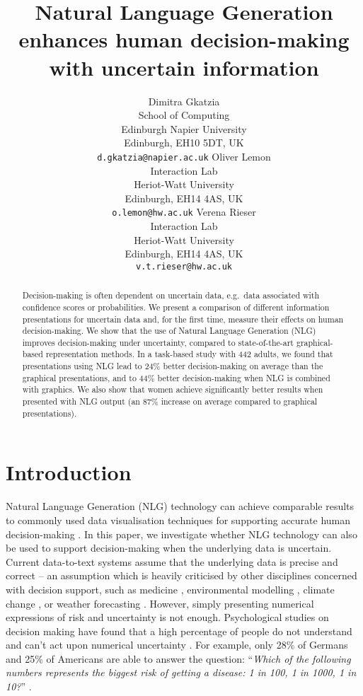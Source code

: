 \documentclass[11pt]{article}
\title{Natural Language Generation enhances human decision-making with uncertain information}%
\author{Dimitra Gkatzia\\
	    School of Computing\\
	    Edinburgh Napier University\\
	    Edinburgh, EH10 5DT, UK\\
	    {\tt d.gkatzia@napier.ac.uk}
	  \And
	Oliver Lemon\\
  	Interaction Lab\\
  	Heriot-Watt University\\
  	Edinburgh, EH14 4AS, UK\\
  {\tt o.lemon@hw.ac.uk}
    \And
	Verena Rieser\\
  	Interaction Lab\\
  	Heriot-Watt University\\
  	Edinburgh, EH14 4AS, UK\\
  {\tt v.t.rieser@hw.ac.uk}}
\date{}
\begin{document}
\maketitle

\begin{abstract}
Decision-making is often dependent on uncertain data, e.g.\ data associated with confidence scores or  probabilities.
We present a  comparison of different information presentations for uncertain data and, for the first time, measure their effects on human decision-making. 
We show that 
 the use of Natural Language Generation (NLG) improves decision-making under uncertainty,  
 compared to  state-of-the-art graphical-based representation methods. In a task-based study with 442 adults, we found that  presentations using NLG lead to 24\% better decision-making on average than the graphical presentations, and to 44\% better decision-making when NLG is combined with graphics.
We also show that 
women achieve significantly better results when   presented with NLG output (an  87\% increase on average compared to graphical presentations). 
\end{abstract}

\section{Introduction}

Natural Language Generation (NLG)  technology can achieve comparable results to commonly used data visualisation techniques for supporting accurate human decision-making \cite{Gatt2009}.
In this paper, we investigate whether NLG technology can also be used to support decision-making when the underlying data is uncertain. 
%
%
Current  data-to-text systems assume that the underlying data is precise and correct -- an assumption which is heavily criticised by other disciplines concerned with decision support, such as medicine \cite{Gigerenzer:11}, environmental modelling \cite{beven:2009}, climate change \cite{IPCC04}, or weather forecasting \cite{WMO:2008}.   %
However, simply presenting  numerical expressions of risk and uncertainty is not enough.
Psychological studies on decision making have found that a high percentage of people do not understand and can't act upon numerical uncertainty \cite{Cokely:2012,galesic:2012}. For example, only 28\% of Germans and 25\% of Americans  are able to answer the question: ``{\em Which of the following numbers represents the biggest risk of getting a disease: 
1 in 100, 1 in 1000, 1 in 10?}'' \cite{galesic:2012}.
  
\end{document}
